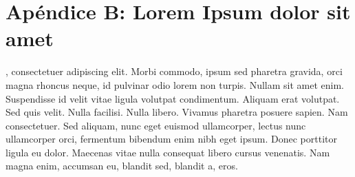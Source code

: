 \chapter*{Apéndice B: Lorem Ipsum dolor sit amet}
\label{apendiceB}

, consectetuer adipiscing elit. Morbi commodo, ipsum sed pharetra gravida, orci magna rhoncus neque, id pulvinar odio lorem non turpis. Nullam sit amet enim. Suspendisse id velit vitae ligula volutpat condimentum. Aliquam erat volutpat. Sed quis velit. Nulla facilisi. Nulla libero. Vivamus pharetra posuere sapien. Nam consectetuer. Sed aliquam, nunc eget euismod ullamcorper, lectus nunc ullamcorper orci, fermentum bibendum enim nibh eget ipsum. Donec porttitor ligula eu dolor. Maecenas vitae nulla consequat libero cursus venenatis. Nam magna enim, accumsan eu, blandit sed, blandit a, eros.
